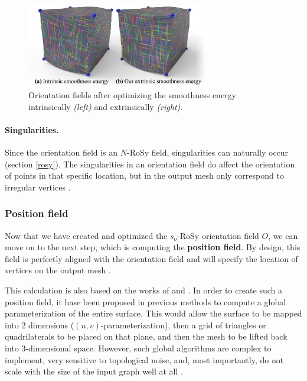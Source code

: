 \documentclass{ACGSeminar}
\begin{document}
\begin{figure}[htb!]
	\begin{centering}
		\includegraphics[width=8cm]{img/orientation-field-illustration.png}\par
	\end{centering}
	\caption{Orientation fields after optimizing the smoothness energy intrinsically \textit{(left)} and extrinsically \textit{(right)}. \cite{jakob2015instant}}
	\label{fig:orientation-field-illustration}
\end{figure}

\paragraph{Singularities.}
Since the orientation field is an $N$-RoSy field, singularities can naturally occur (section \ref{rosy}). The singularities in an orientation field do affect the orientation of points in that specific location, but in the output mesh only correspond to irregular vertices \cite{jakob2015instant}.

\subsubsection{Position field}
Now that we have created and optimized the $s_o$-RoSy orientation field $O$, we can move on to the next step, which is computing the \textbf{position field}. By design, this field is perfectly aligned with the orientation field and will specify the location of vertices on the output mesh \cite{jakob2015instant}.\bigskip

This calculation is also based on the works of \cite{bommes2009mixed} and \cite{ray2006periodic}. In order to create such a position field, it hase been proposed in previous methods to compute a global parameterization of the entire surface. This would allow the surface to be mapped into 2 dimensions ($(u,v)$-parameterization), then a grid of triangles or quadrilaterals to be placed on that plane, and then the mesh to be lifted back into 3-dimensional space. However, such global algorithms are complex to implement, very sensitive to topological noise, and, most importantly, do not scale with the size of the input graph well at all \cite{jakob2015instant}.\bigskip
\end{document}
